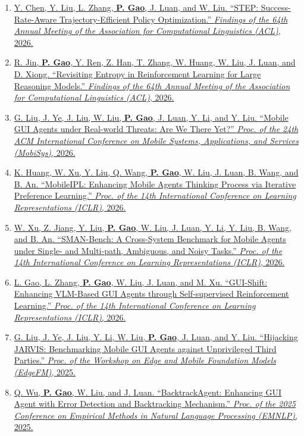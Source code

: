 \documentclass[10pt]{article}
\makeatletter
\newlength{\bibhang}
\newlength{\bibsep}
 {\@listi \global\bibsep\itemsep \global\advance\bibsep by\parsep}
\newenvironment{bibsection}%
        {\begin{enumerate}{}{%
       \setlength{\leftmargin}{\bibhang}%
       \setlength{\itemindent}{-\leftmargin}%
       \setlength{\itemsep}{\bibsep}%
       \setlength{\parsep}{\z@}%
        \setlength{\partopsep}{0pt}%
        \setlength{\topsep}{0pt}}}
        {\end{enumerate}\vspace{-.6\baselineskip}}
\makeatother
\begin{document}
\begin{bibsection}
\item \href{}{Y. Chen, Y. Liu, L. Zhang, {\bf P. Gao}, J. Luan, and W. Liu. ``STEP: Success-Rate-Aware Trajectory-Efficient Policy Optimization.'' \emph{Findings of the 64th Annual Meeting of the Association for Computational Linguistics (ACL)}, 2026.}

\item \href{}{R. Jin, {\bf P. Gao}, Y. Ren, Z. Han, T. Zhang, W. Huang, W. Liu, J. Luan, and D. Xiong. ``Revisiting Entropy in Reinforcement Learning for Large Reasoning Models.'' \emph{Findings of the 64th Annual Meeting of the Association for Computational Linguistics (ACL)}, 2026.}

\item \href{}{G. Liu, J. Ye, J. Liu, W. Liu, {\bf P. Gao}, J. Luan, Y. Li, and Y. Liu. ``Mobile GUI Agents under Real-world Threats: Are We There Yet?'' \emph{Proc. of the 24th ACM International Conference on Mobile Systems, Applications, and Services (MobiSys)}, 2026.}

\item \href{}{K. Huang, W. Xu, Y. Liu, Q. Wang, {\bf P. Gao}, W. Liu, J. Luan, B. Wang, and B. An. ``MobileIPL: Enhancing Mobile Agents Thinking Process via Iterative Preference Learning.'' \emph{Proc. of the 14th International Conference on Learning Representations (ICLR)}, 2026.}

\item \href{}{W. Xu, Z. Jiang, Y. Liu, {\bf P. Gao}, W. Liu, J. Luan, Y. Li, Y. Liu, B. Wang, and B. An. ``SMAN-Bench: A Cross-System Benchmark for Mobile Agents under Single- and Multi-path, Ambiguous, and Noisy Tasks.'' \emph{Proc. of the 14th International Conference on Learning Representations (ICLR)}, 2026.}

\item \href{}{L. Gao, L. Zhang, {\bf P. Gao}, W. Liu, J. Luan, and M. Xu. ``GUI-Shift: Enhancing VLM-Based GUI Agents through Self-supervised Reinforcement Learning.'' \emph{Proc. of the 14th International Conference on Learning Representations (ICLR)}, 2026.}

\item \href{}{G. Liu, J. Ye, J. Liu, Y. Li, W. Liu, {\bf P. Gao}, J. Luan, and Y. Liu. ``Hijacking JARVIS: Benchmarking Mobile GUI Agents against Unprivileged Third Parties.'' \emph{Proc. of the Workshop on Edge and Mobile Foundation Models (EdgeFM)}, 2025.}

\item \href{}{Q. Wu, {\bf P. Gao}, W. Liu, and J. Luan. ``BacktrackAgent: Enhancing GUI Agent with Error Detection and Backtracking Mechanism.'' \emph{Proc. of the 2025 Conference on Empirical Methods in Natural Language Processing (EMNLP)}, 2025.}


\end{bibsection}
\end{document}
